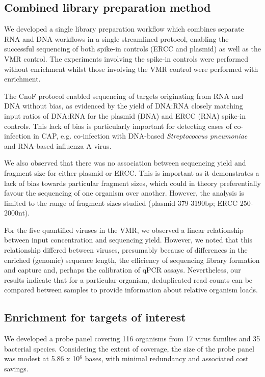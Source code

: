 \subsection{Combined library preparation method}
We developed a single library preparation workflow which combines separate RNA and DNA workflows in a single streamlined protocol, enabling the successful sequencing of both spike-in controls (ERCC and plasmid) as well as the VMR control. The experiments involving the spike-in controls were performed without enrichment whilst those involving the VMR control were performed with enrichment.

The CnoF protocol enabled sequencing of targets originating from RNA and DNA without bias, as evidenced by the yield of DNA:RNA closely matching input ratios of DNA:RNA for the plasmid (DNA) and ERCC (RNA) spike-in controls. This lack of bias is particularly important for detecting cases of co-infection in CAP, e.g. co-infection with DNA-based \textit{Streptococcus pneumoniae} and RNA-based influenza A virus. 

We also observed that there was no association between sequencing yield and fragment size for either plasmid or ERCC. This is important as it demonstrates a lack of bias towards particular fragment sizes, which could in theory preferentially favour the sequencing of one organism over another. However, the analysis is limited to the range of fragment sizes studied (plasmid 379-3190bp; ERCC 250-2000nt). 

For the five quantified viruses in the VMR, we observed a linear relationship between input concentration and sequencing yield. However, we noted that this relationship differed between viruses, presumably because of differences in the enriched (genomic) sequence length, the efficiency of sequencing library formation and capture and, perhaps the calibration of qPCR assays. Nevertheless, our results indicate that for a particular organism, deduplicated read counts can be compared between samples to provide information about relative organism loads. 

\subsection{Enrichment for targets of interest}
We developed a probe panel covering 116 organisms from 17 virus families and 35 bacterial species. Considering the extent of coverage, the size of the probe panel was modest at 5.86 x 10$^6$ bases, with minimal redundancy and associated cost savings. 

